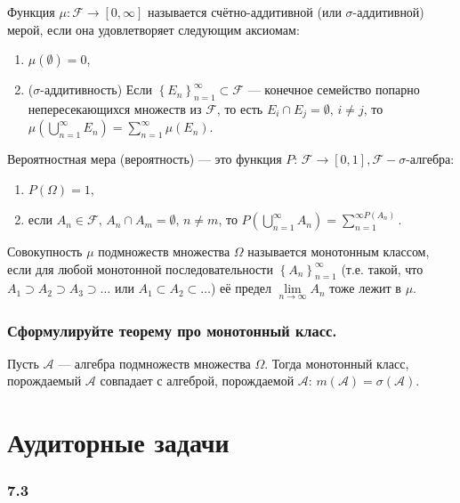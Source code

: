 Функция $ \mu: \mathcal{F} \rightarrow \left[ 0, \infty \right] $ называется счётно-аддитивной (или $ \sigma $-аддитивной) мерой, если она удовлетворяет следующим аксиомам:
\begin{enumerate}
\item $ \mu \left( \emptyset \right) = 0$,
\item ($ \sigma $-аддитивность) Если
$ \left\{ E_n \right\}_{n=1}^{ \infty } \subset \mathcal{F}$
--- конечное семейство попарно непересекающихся множеств из
$ \mathcal{F}$, то есть $E_i \cap E_j = \emptyset, \, i \neq j$,
то $ \mu \left( \bigcup \limits_{n=1}^{ \infty } E_n \right) = \sum \limits_{n=1}^{ \infty } \mu \left( E_n \right)$.
\end{enumerate}

Вероятностная мера (вероятность) --- это функция $P: \, \mathcal{F} \rightarrow \left[ 0, 1 \right], \mathcal{F} - \sigma $-алгебра:
\begin{enumerate}
\item $P \left( \Omega \right) = 1$,
\item если
$A_n \in \mathcal{F}, \,
A_n \cap A_m = \emptyset, \,
n \neq m$, то $P \left( \bigcup \limits_{n=1}^{ \infty } A_n \right) = \sum \limits_{n=1}^{ \infty  P \left( A_n \right) }$.
\end{enumerate}

Совокупность $ \mu $ подмножеств множества $ \Omega $ называется монотонным классом,
если для любой монотонной последовательности $ \left\{ A_n \right\}_{n=1}^{ \infty } $
(т.е. такой,
что $A_1 \supset A_2 \supset A_3 \supset \dotsc $ или $A_1 \subset A_2 \subset \dotsc $) её предел $ \lim \limits_{n \rightarrow \infty } A_n$ тоже лежит в $ \mu $.

\subsubsection*{Сформулируйте теорему про монотонный класс.}

Пусть $ \mathcal{A}$ --- алгебра подмножеств множества $ \Omega $.
Тогда монотонный класс, порождаемый $ \mathcal{A}$ совпадает с алгеброй, порождаемой $ \mathcal{A}: \, m \left( \mathcal{A} \right) = \sigma \left( \mathcal{A} \right) $.

\section*{Аудиторные задачи}

\subsubsection*{7.3}

